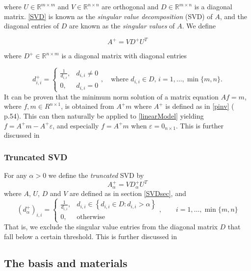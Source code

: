 \documentclass[12pt,a4]{article}
\newcommand{\R}{{\mathbb R}}
\begin{document}
where $U \in \R^{m \times m}$ and $V \in \R^{n \times n}$ are orthogonal and $D \in \R^{m \times n}$ is a diagonal matrix. \eqref{SVD} is known as the \emph{singular value decomposition} (SVD) of $A$, and the diagonal entries of $D$ are known as the \emph{singular values} of $A$. We define 

\begin{equation}\label{pinv}
A^+ = VD^+U^T
\end{equation}

where $D^+ \in \R^{n \times m}$ is a diagonal matrix with diagonal entries 

\begin{equation*}
d^+_{i,i} = 
\begin{cases}
    \frac{1}{d_{i,i}}, & d_{i,i} \neq 0 \\
    0, & d_{i,i} = 0
\end{cases}
,\quad \text{where } d_{i,i} \in D, \,i = 1, \ldots ,\min\{m,n\}.
\end{equation*}
It can be proven that the minimum norm solution of a matrix equation $Af = m$, where $f,m \in R^{n \times 1}$, is obtained from $A^+m$ where $A^+$ is defined as in \eqref{pinv} (\cite{samu} p.54). This can then naturally be applied to \eqref{linearModel} yielding $f = A^+m - A^+\varepsilon$, and especially 
$f = A^+m$ when $\varepsilon = 0_{n \times 1}$. This is further discussed in


\subsubsection{Truncated SVD}
For any $\alpha > 0$ we define the \emph{truncated} SVD by 
\begin{equation}\label{truncSVD}
A^+_\alpha = V D^+_\alpha U^T
\end{equation}
where $A$, $U$, $D$ and $V$ are defined as in section \ref{SVDsec}, and 
\begin{equation*}
(d^+_\alpha)_{i,i} = 
\begin{cases}
    \frac{1}{d_{i,i}}, & 
    d_{i,i} \in \left\{d_{i,i} \in D:d_{i,i} > \alpha \right\} \\
    0, & \text{otherwise}
\end{cases}
,\quad\quad i = 1, \ldots, \min\{m,n\}
\end{equation*}
That is, we exclude the singular value entries from the diagonal matrix $D$ that fall below a certain threshold. This is further discussed in


\subsection{The basis and materials}
\end{document}

